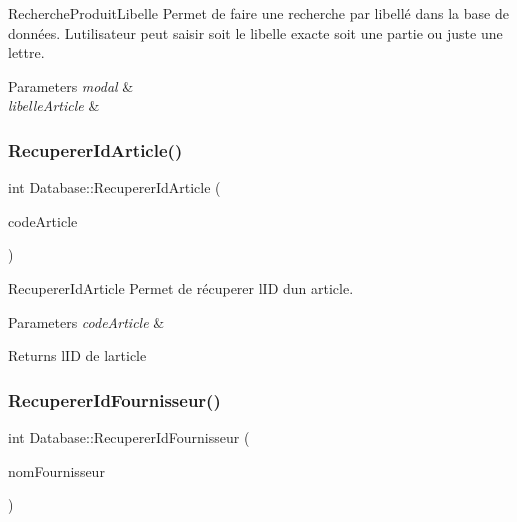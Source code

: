 Recherche\+Produit\+Libelle Permet de faire une recherche par libellé dans la base de données. L\textquotesingle{}utilisateur peut saisir soit le libelle exacte soit une partie ou juste une lettre. 


\begin{DoxyParams}{Parameters}
{\em modal} & \\
\hline
{\em libelle\+Article} & \\
\hline
\end{DoxyParams}
\mbox{\label{class_database_a1f5de294783ac0aec3d44fd6faf4fd7c}} 
\subsubsection{\texorpdfstring{Recuperer\+Id\+Article()}{RecupererIdArticle()}}
{\footnotesize\ttfamily int Database\+::\+Recuperer\+Id\+Article (\begin{DoxyParamCaption}\item[{Q\+String}]{code\+Article }\end{DoxyParamCaption})}



Recuperer\+Id\+Article Permet de récuperer l\textquotesingle{}ID d\textquotesingle{}un article. 


\begin{DoxyParams}{Parameters}
{\em code\+Article} & \\
\hline
\end{DoxyParams}
\begin{DoxyReturn}{Returns}
l\textquotesingle{}ID de l\textquotesingle{}article 
\end{DoxyReturn}
\mbox{\label{class_database_a56ab74f41841b337e2e19e790d524542}} 
\subsubsection{\texorpdfstring{Recuperer\+Id\+Fournisseur()}{RecupererIdFournisseur()}}
{\footnotesize\ttfamily int Database\+::\+Recuperer\+Id\+Fournisseur (\begin{DoxyParamCaption}\item[{Q\+String}]{nom\+Fournisseur }\end{DoxyParamCaption})}



